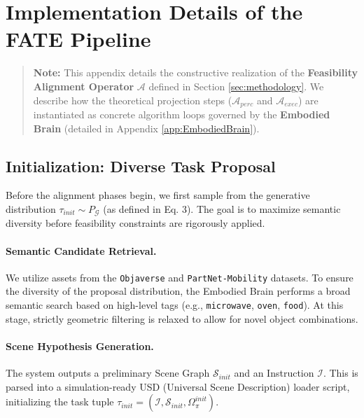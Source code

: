 \documentclass{article}
\theoremstyle{plain}
\theoremstyle{definition}
\theoremstyle{remark}
\begin{document}



\section{Implementation Details of the FATE Pipeline}
\label{app:implementation}

\begin{quote}
\textbf{Note:} This appendix details the constructive realization of the \textbf{Feasibility Alignment Operator} $\mathcal{A}$ defined in Section \ref{sec:methodology}. We describe how the theoretical projection steps ($\mathcal{A}_{perc}$ and $\mathcal{A}_{exec}$) are instantiated as concrete algorithm loops governed by the \textbf{Embodied Brain} (detailed in Appendix \ref{app:EmbodiedBrain}).
\end{quote}

\subsection{Initialization: Diverse Task Proposal}
\label{sub:init_proposal}

Before the alignment phases begin, we first sample from the generative distribution $\tau_{init} \sim P_{\mathcal{G}}$ (as defined in Eq. 3). The goal is to maximize semantic diversity before feasibility constraints are rigorously applied.

\paragraph{Semantic Candidate Retrieval.}
We utilize assets from the \texttt{Objaverse} \cite{deitke2023objaverse} and \texttt{PartNet-Mobility} \cite{Mo_2019_CVPR} datasets. To ensure the diversity of the proposal distribution, the Embodied Brain performs a broad semantic search based on high-level tags (e.g., \texttt{microwave}, \texttt{oven}, \texttt{food}). At this stage, strictly geometric filtering is relaxed to allow for novel object combinations.

\paragraph{Scene Hypothesis Generation.}
The system outputs a preliminary Scene Graph $\mathcal{S}_{init}$ and an Instruction $\mathcal{I}$. This is parsed into a simulation-ready USD (Universal Scene Description) loader script, initializing the task tuple $\tau_{init} = (\mathcal{I}, \mathcal{S}_{init}, \Omega_{\pi}^{init})$.
\end{document}
